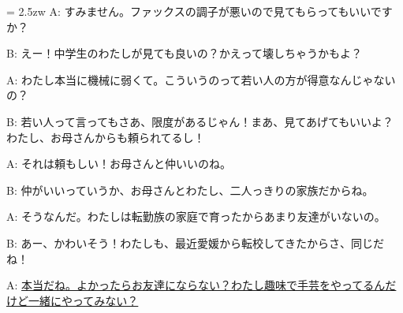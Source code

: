 \documentclass[11pt]{amsart}
\title{}
\author{}
\newenvironment{hangall}[1]{\hangindent = 2.5zw\everypar{\hangindent = 2.5zw}}{}
\begin{document}
\maketitle
\begin{hangall}{}%
A: すみません。ファックスの調子が悪いので見てもらってもいいですか？

B: えー！中学生のわたしが見ても良いの？かえって壊しちゃうかもよ？

A: わたし本当に機械に弱くて。こういうのって若い人の方が得意なんじゃないの？

B: 若い人って言ってもさあ、限度があるじゃん！まあ、見てあげてもいいよ？わたし、お母さんからも頼られてるし！

A: それは頼もしい！お母さんと仲いいのね。

B: 仲がいいっていうか、お母さんとわたし、二人っきりの家族だからね。

A: そうなんだ。わたしは転勤族の家庭で育ったからあまり友達がいないの。

B: あー、かわいそう！わたしも、最近愛媛から転校してきたからさ、同じだね！

A: \ul{本当だね。よかったらお友達にならない？わたし趣味で手芸をやってるんだけど一緒にやってみない？}\end{hangall}
\end{document}

